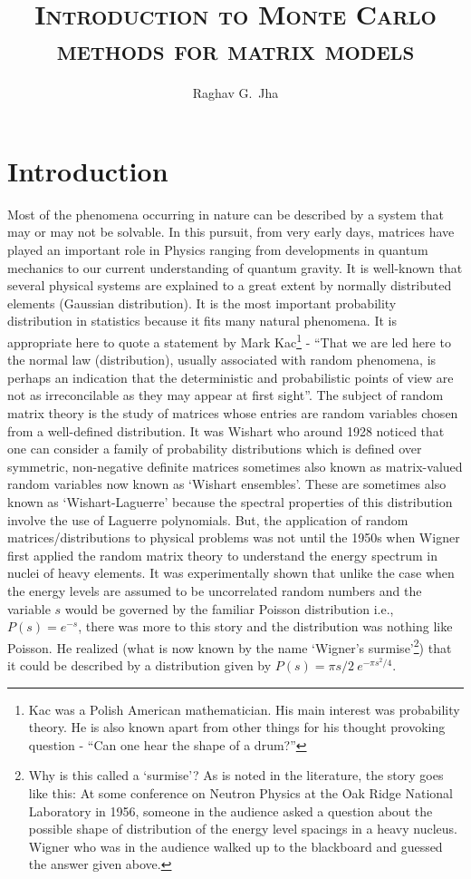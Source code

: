 \documentclass[letter,11pt]{article}
\title{\textsc{Introduction to Monte Carlo methods for matrix models}}
\author[a]{Raghav G.~Jha}
\affiliation{Perimeter Institute for Theoretical Physics, Waterloo, Ontario N2L 2Y5, Canada}
\begin{document}
\date{}
\maketitle

\section{Introduction}

Most of the phenomena occurring in nature can be described by a system that may or may not be solvable. 
In this pursuit, from very early days, matrices have played an important role in Physics ranging from 
developments in quantum mechanics to our current understanding of quantum gravity. 
It is well-known that several physical systems are explained to a great extent 
by normally distributed elements (Gaussian distribution). It is the most important probability 
distribution in statistics because it fits many natural phenomena. It is appropriate here to quote a statement by Mark Kac\footnote{Kac was a Polish American mathematician. His main interest was probability theory. He is also known apart from other things for his thought provoking question - ``Can one hear 
the shape of a drum?''} - ``That we are led here to the normal law (distribution), usually associated with random phenomena, is perhaps
an indication that the deterministic and probabilistic points of view are not as irreconcilable as they may appear at first sight''.
The subject of random matrix theory is the study of matrices whose entries are random 
variables chosen from a well-defined distribution. It was Wishart who 
around 1928 noticed that one can consider a family of 
probability distributions which is defined over symmetric, non-negative definite 
matrices sometimes also known as matrix-valued random variables 
now known as `Wishart ensembles'. These are sometimes also known 
as `Wishart-Laguerre' because the spectral properties of this distribution 
involve the use of Laguerre polynomials. But, the application of random matrices/distributions
to physical problems was not until the 1950s
when Wigner first applied the random matrix theory 
to understand the energy spectrum in nuclei of heavy elements. It was experimentally 
shown that unlike the case when the energy levels are assumed to be uncorrelated
random numbers and the variable $s$ would be governed by the familiar Poisson distribution 
i.e., $P(s) = e^{-s}$, there was more to this story and the distribution was nothing like Poisson. 
He realized (what is now known by the name `Wigner's surmise'\footnote{Why is this called a `surmise'? 
As is noted in the literature, the story goes like this: At some conference on Neutron Physics at the Oak 
Ridge National Laboratory in 1956, someone in the audience asked a question about the possible shape 
of distribution of the energy level spacings in a heavy nucleus. Wigner who was in the audience 
walked up to the blackboard and guessed the answer given above.}) that it could be described by a distribution given by $P(s) = \pi s/2~e^{-\pi s^2/4}$. 
\end{document}

